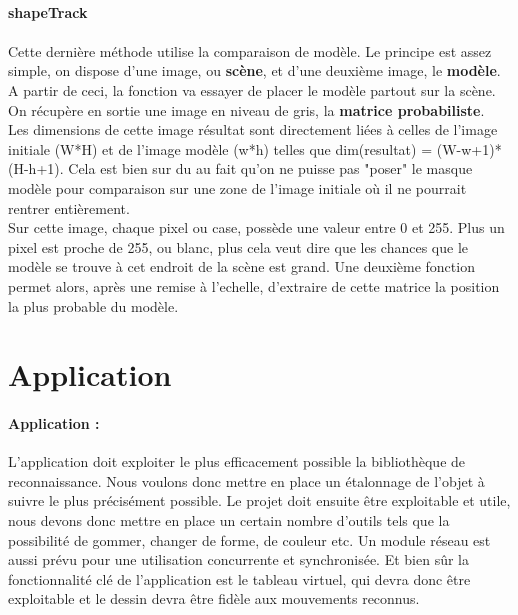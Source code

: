 \documentclass{report}
\begin{document}
						\paragraph{shapeTrack} \paragraph{}
						Cette dernière méthode utilise la comparaison de modèle. Le principe est assez simple, on dispose d'une image, ou \textbf{scène}, et d'une deuxième image, le \textbf{modèle}. A partir de ceci, la fonction va essayer de placer le modèle partout sur la scène. On récupère en sortie une image en niveau de gris, la \textbf{matrice probabiliste}.\\Les dimensions de cette image résultat sont directement liées à celles de l'image initiale (W*H) et de l'image modèle (w*h) telles que dim(resultat) =  (W-w+1)* (H-h+1). Cela est bien sur du au fait qu'on ne puisse pas "poser" le masque modèle pour comparaison sur une zone de l'image initiale où il ne pourrait rentrer entièrement.\\ Sur cette image, chaque pixel ou case, possède une valeur entre 0 et 255. Plus un pixel est proche de 255, ou blanc, plus cela veut dire que les chances que le modèle se trouve à cet endroit de la scène est grand. Une deuxième fonction permet alors, après une remise à l'echelle, d'extraire de cette matrice la position la plus probable du modèle.
\newpage
						
		\section{Application}
	\paragraph{Application :\\}
L'application doit exploiter le plus efficacement possible la bibliothèque de reconnaissance. Nous voulons donc mettre en place un étalonnage de l'objet à suivre le plus précisément possible. Le projet doit ensuite être exploitable et utile, nous devons donc mettre en place un certain nombre d'outils tels que la possibilité de gommer, changer de forme, de couleur etc. 
Un module réseau est aussi prévu pour une utilisation concurrente et synchronisée. Et bien sûr la fonctionnalité clé de l'application est le tableau virtuel, qui devra donc être exploitable et le dessin devra être fidèle aux mouvements reconnus.
\end{document}
